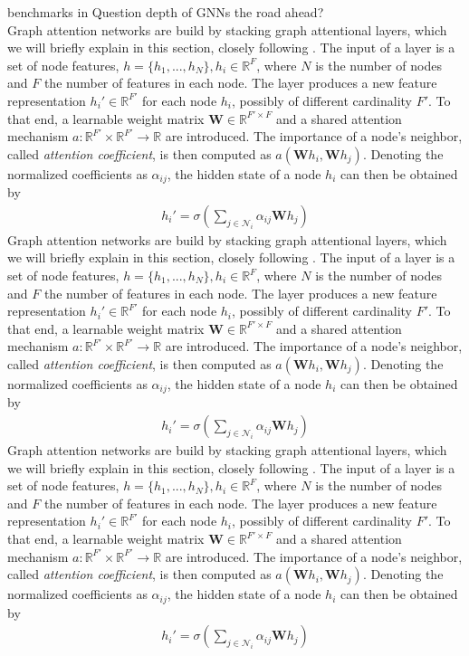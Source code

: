 \label{chapter:related_work}

benchmarks in Question
depth of GNNs
the road ahead?\\
Graph attention networks are build by stacking graph attentional layers, which we will briefly explain in this section, closely following \cite{velickovic2018graph}. The input of a layer is a set of node features, $h = \{h_1,...,h_N\}, h_i \in \mathbb{R}^F$, where $N$ is the number of nodes and $F$ the number of features in each node. The layer produces a new feature representation $h_i' \in \mathbb{R}^{F'}$ for each node $h_i$, possibly of different cardinality $F'$. To that end, a learnable weight matrix $\mathbf{W} \in \mathbb{R}^{F' \times F}$ and a shared attention mechanism $a: \mathbb{R}^{F'} \times \mathbb{R}^{F'} \rightarrow \mathbb{R}$ are introduced. The importance of a node's neighbor, called \textit{attention coefficient}, is then computed as $a(\mathbf{W}h_i, \mathbf{W}h_j)$. Denoting the normalized coefficients as $\alpha_{ij}$, the hidden state of a node $h_i$ can then be obtained by
\begin{align*}
    h_i' = \sigma(\sum_{j \in \mathcal{N}_i} \alpha_{ij}\mathbf{W}h_j)
\end{align*}Graph attention networks are build by stacking graph attentional layers, which we will briefly explain in this section, closely following \cite{velickovic2018graph}. The input of a layer is a set of node features, $h = \{h_1,...,h_N\}, h_i \in \mathbb{R}^F$, where $N$ is the number of nodes and $F$ the number of features in each node. The layer produces a new feature representation $h_i' \in \mathbb{R}^{F'}$ for each node $h_i$, possibly of different cardinality $F'$. To that end, a learnable weight matrix $\mathbf{W} \in \mathbb{R}^{F' \times F}$ and a shared attention mechanism $a: \mathbb{R}^{F'} \times \mathbb{R}^{F'} \rightarrow \mathbb{R}$ are introduced. The importance of a node's neighbor, called \textit{attention coefficient}, is then computed as $a(\mathbf{W}h_i, \mathbf{W}h_j)$. Denoting the normalized coefficients as $\alpha_{ij}$, the hidden state of a node $h_i$ can then be obtained by
\begin{align*}
    h_i' = \sigma(\sum_{j \in \mathcal{N}_i} \alpha_{ij}\mathbf{W}h_j)
\end{align*}Graph attention networks are build by stacking graph attentional layers, which we will briefly explain in this section, closely following \cite{velickovic2018graph}. The input of a layer is a set of node features, $h = \{h_1,...,h_N\}, h_i \in \mathbb{R}^F$, where $N$ is the number of nodes and $F$ the number of features in each node. The layer produces a new feature representation $h_i' \in \mathbb{R}^{F'}$ for each node $h_i$, possibly of different cardinality $F'$. To that end, a learnable weight matrix $\mathbf{W} \in \mathbb{R}^{F' \times F}$ and a shared attention mechanism $a: \mathbb{R}^{F'} \times \mathbb{R}^{F'} \rightarrow \mathbb{R}$ are introduced. The importance of a node's neighbor, called \textit{attention coefficient}, is then computed as $a(\mathbf{W}h_i, \mathbf{W}h_j)$. Denoting the normalized coefficients as $\alpha_{ij}$, the hidden state of a node $h_i$ can then be obtained by
\begin{align*}
    h_i' = \sigma(\sum_{j \in \mathcal{N}_i} \alpha_{ij}\mathbf{W}h_j)
\end{align*}